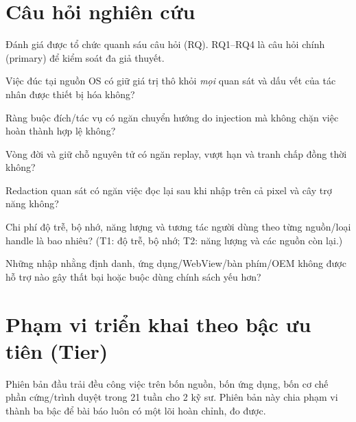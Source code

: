 \documentclass[11pt,a4paper]{article}
\newcommand{\Tone}{\textbf{\color{shgreen}[T1]}}
\newcommand{\Ttwo}{\textbf{\color{shblue}[T2]}}
\begin{document}
\section{Câu hỏi nghiên cứu}

Đánh giá được tổ chức quanh sáu câu hỏi (RQ). RQ1--RQ4 là câu hỏi chính (primary) để kiểm soát đa giả thuyết.

\begin{description}[leftmargin=1.6cm,style=nextline]
  \item[RQ1 \Tone] Việc đúc tại nguồn OS có giữ giá trị thô khỏi \emph{mọi} quan sát và dấu vết của tác nhân được
             thiết bị hóa không?
  \item[RQ2 \Tone] Ràng buộc đích/tác vụ có ngăn chuyển hướng do injection mà không chặn việc hoàn thành hợp lệ không?
  \item[RQ3 \Tone] Vòng đời và giữ chỗ nguyên tử có ngăn replay, vượt hạn và tranh chấp đồng thời không?
  \item[RQ4 \Tone] Redaction quan sát có ngăn việc đọc lại sau khi nhập trên cả pixel và cây trợ năng không?
  \item[RQ5 \Tone/\Ttwo] Chi phí độ trễ, bộ nhớ, năng lượng và tương tác người dùng theo từng nguồn/loại handle là bao nhiêu?
             (T1: độ trễ, bộ nhớ; T2: năng lượng và các nguồn còn lại.)
  \item[RQ6 \Ttwo] Những nhập nhằng định danh, ứng dụng/WebView/bàn phím/OEM không được hỗ trợ nào gây thất bại
             hoặc buộc dùng chính sách yếu hơn?
\end{description}

\section{Phạm vi triển khai theo bậc ưu tiên (Tier)}
\label{sec:tier}

Phiên bản đầu trải đều công việc trên bốn nguồn, bốn ứng dụng, bốn cơ chế phần cứng/trình duyệt trong 21 tuần
cho 2 kỹ sư. Phiên bản này chia phạm vi thành ba bậc để bài báo luôn có một lõi hoàn chỉnh, đo được.
\end{document}
